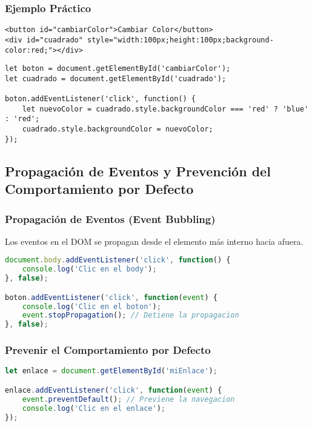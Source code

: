 \documentclass{book}
\begin{document}
\subsubsection{Ejemplo Práctico}

\begin{lstlisting}[language=HTML5]
<button id="cambiarColor">Cambiar Color</button>
<div id="cuadrado" style="width:100px;height:100px;background-color:red;"></div>
\end{lstlisting}

\begin{lstlisting}
let boton = document.getElementById('cambiarColor');
let cuadrado = document.getElementById('cuadrado');

boton.addEventListener('click', function() {
    let nuevoColor = cuadrado.style.backgroundColor === 'red' ? 'blue' : 'red';
    cuadrado.style.backgroundColor = nuevoColor;
});
\end{lstlisting}

\subsection{Propagación de Eventos y Prevención del Comportamiento por Defecto}

\subsubsection{Propagación de Eventos (Event Bubbling)}

Los eventos en el DOM se propagan desde el elemento más interno hacia afuera.

\begin{lstlisting}[language=JavaScript]
document.body.addEventListener('click', function() {
    console.log('Clic en el body');
}, false);

boton.addEventListener('click', function(event) {
    console.log('Clic en el boton');
    event.stopPropagation(); // Detiene la propagacion
}, false);
\end{lstlisting}

\subsubsection{Prevenir el Comportamiento por Defecto}

\begin{lstlisting}[language=JavaScript]
let enlace = document.getElementById('miEnlace');

enlace.addEventListener('click', function(event) {
    event.preventDefault(); // Previene la navegacion
    console.log('Clic en el enlace');
});
\end{lstlisting}
\end{document}
